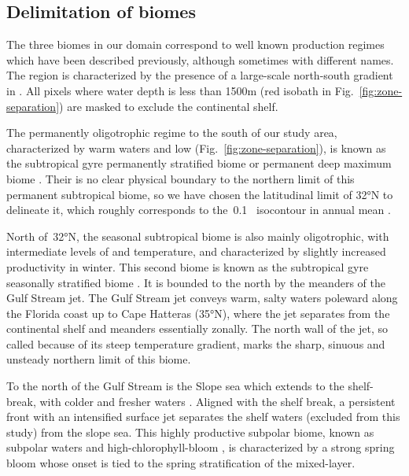 \subsection{Delimitation of biomes}

The three biomes in our domain correspond to well known production regimes which have been described previously, although sometimes with different names.
The region is characterized by the presence of a large-scale north-south gradient in .
All pixels where water depth is less than 1500m (red isobath in Fig.~\ref{fig:zone-separation}) are masked to exclude the continental shelf.

The permanently oligotrophic regime to the south of our study area, characterized by warm waters and low  (Fig.~\ref{fig:zone-separation}), is known as the subtropical gyre permanently stratified biome \parencite{sarmiento_2004} or permanent deep  maximum biome \parencite{bock_2022}.
Their is no clear physical boundary to the northern limit of this permanent subtropical biome, so we have chosen the latitudinal limit of 32°N to delineate it, which roughly corresponds to the~\qty{0.1}{\mgm}~ isocontour in annual mean .

North of~\ang{32}N, the seasonal subtropical biome is also mainly oligotrophic, with intermediate levels of  and temperature, and characterized by slightly increased productivity in winter.
This second biome is known as the subtropical gyre seasonally stratified biome \parencite{sarmiento_2004}.
It is bounded to the north by the meanders of the Gulf Stream jet.
The Gulf Stream jet conveys warm, salty waters poleward along the Florida coast up to Cape Hatteras (\ang{35}N), where the jet separates from the continental shelf and meanders essentially zonally.
The north wall of the jet, so called because of its steep temperature gradient, marks the sharp, sinuous and unsteady northern limit of this biome.

To the north of the Gulf Stream is the Slope sea which extends to the shelf-break, with colder and fresher waters \parencite{linder_1998}.
Aligned with the shelf break, a persistent front with an intensified surface jet separates the shelf waters (excluded from this study) from the slope sea.
This highly productive subpolar biome, known as subpolar waters \parencite{sarmiento_2004} and high-chlorophyll-bloom \parencite{bock_2022}, is characterized by a strong spring bloom whose onset is tied to the spring stratification of the mixed-layer.

